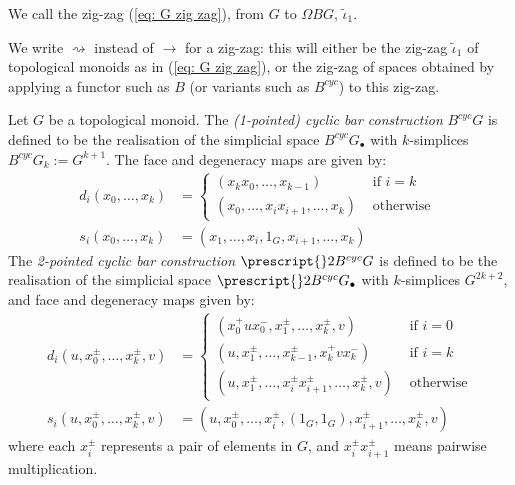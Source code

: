 \documentclass{TPmod}
\def\BB{\prescript{}2B}
\numberwithin{equation}{section}
\begin{document}
    \begin{defn}
        We call the zig-zag (\ref{eq: G zig zag}), from $G$ to $\Omega BG$, $\widetilde \iota_1$.
    
        We write $\rightsquigarrow$ instead of $\to$ for a zig-zag: this will either be the zig-zag $\widetilde \iota_1$ of topological monoids as in (\ref{eq: G zig zag}), or the zig-zag of spaces obtained by applying a functor such as $B$ (or variants such as $B^{cyc}$) to this zig-zag.
    \end{defn}
    \begin{defn}
        Let $G$ be a topological monoid. The \emph{(1-pointed) cyclic bar construction} $B^{cyc}G$ is defined to be the realisation of the simplicial space $B^{cyc}G_\bullet$ with $k$-simplices $B^{cyc}G_k := G^{k+1}$. The face and degeneracy maps are given by:
        \begin{align}
            d_i(x_0, \ldots, x_k) 
            &=
            \begin{cases}
                (x_k x_0, \ldots, x_{k-1})
                &
                \textrm{ if } i=k
                \\
                (x_0, \ldots, x_i x_{i+1}, \ldots, x_k)
                &
                \textrm{ otherwise } 
            \end{cases}
            \\
            s_i(x_0, \ldots, x_k)
            &=
            (x_1, \ldots, x_i, 1_G, x_{i+1}, \ldots, x_k)
        \end{align}
        The \emph{2-pointed cyclic bar construction} $\BB^{cyc}G$ is defined to be the realisation of the simplicial space $\BB^{cyc}G_\bullet$ with $k$-simplices $G^{2k+2}$, and face and degeneracy maps given by:
        \begin{align}
            d_i(u, x_0^\pm, \ldots, x_k^\pm, v) 
            &=
            \begin{cases}
                (x_0^+ u x_0^-, x_1^\pm, \ldots, x_k^\pm, v)
                & \textrm{ if } i=0\\
                (u, x_1^\pm, \ldots, x_{k-1}^\pm, x_k^+ v x_k^-)
                & \textrm{ if } i=k\\
                (u, x_1^\pm, \ldots, x_{i}^\pm x_{i+1}^\pm, \ldots, x_k^\pm, v)
                & \textrm{ otherwise}
            \end{cases}
            \\
            s_i(u, x_0^\pm, \ldots, x_k^\pm, v) 
            &=
            (u, x_0^\pm, \ldots, x_i^\pm, (1_G, 1_G), x_{i+1}^\pm, \ldots, x_k^\pm, v)
        \end{align}
        where each $x_i^\pm$ represents a pair of elements in $G$, and $x_i^\pm x_{i+1}^\pm$ means pairwise multiplication.


\end{defn}
\end{document}
